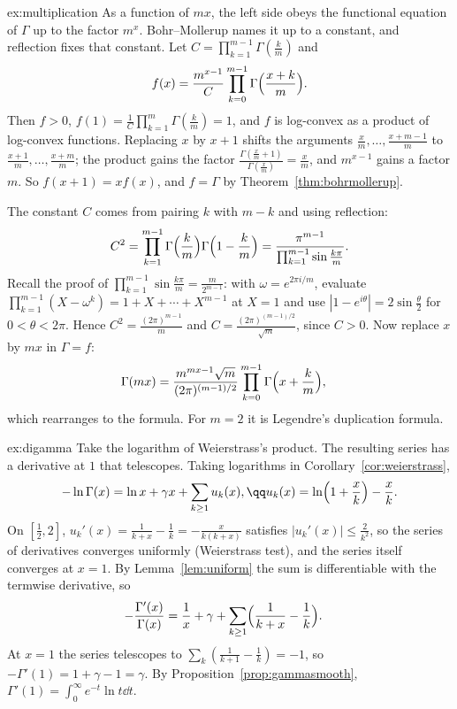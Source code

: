 \begin{solution}{ex:multiplication}
\idea As a function of $mx$, the left side obeys the functional equation of $\Gamma$ up to the factor $m^x$. Bohr--Mollerup names it up to a constant, and reflection fixes that constant.
\writeup Let $C=\prod_{k=1}^{m-1}\Gamma(\frac km)$ and
\[
f(x)=\frac{m^{x-1}}C\prod_{k=0}^{m-1}\Gamma\Bigl(\frac{x+k}m\Bigr).
\]
Then $f>0$, $f(1)=\frac1C\prod_{k=1}^m\Gamma(\frac km)=1$, and
$f$ is log-convex as a product of log-convex functions. Replacing $x$ by $x+1$ shifts the arguments $\frac xm,\dots,\frac{x+m-1}m$ to
$\frac{x+1}m,\dots,\frac{x+m}m$; the product gains the factor $\frac{\Gamma(\frac xm+1)}{\Gamma(\frac xm)}=\frac xm$, and $m^{x-1}$ gains a factor $m$. So
$f(x+1)=xf(x)$, and $f=\Gamma$ by Theorem~\ref{thm:bohrmollerup}.

The constant $C$ comes from pairing $k$ with $m-k$ and using reflection:
\[
C^2=\prod_{k=1}^{m-1}\Gamma\Bigl(\frac km\Bigr)\Gamma\Bigl(1-\frac km\Bigr)=\frac{\pi^{m-1}}{\prod_{k=1}^{m-1}\sin\frac{k\pi}m}.
\]
Recall the proof of $\prod_{k=1}^{m-1}\sin\frac{k\pi}m=\frac m{2^{m-1}}$: with $\omega=e^{2\pi i/m}$, evaluate $\prod_{k=1}^{m-1}(X-\omega^k)=1+X+\cdots+X^{m-1}$ at
$X=1$ and use $|1-e^{i\theta}|=2\sin\frac\theta2$ for $0<\theta<2\pi$. Hence $C^2=\frac{(2\pi)^{m-1}}m$ and $C=\frac{(2\pi)^{(m-1)/2}}{\sqrt m}$, since $C>0$. Now replace $x$
by $mx$ in $\Gamma=f$:
\[
\begin{aligned}\Gamma(mx)&=\frac{m^{mx-1}\sqrt m}{(2\pi)^{(m-1)/2}}\prod_{k=0}^{m-1}\Gamma\Bigl(x+\frac km\Bigr),\end{aligned}
\]
which rearranges to the formula. For $m=2$ it is Legendre's duplication formula.
\end{solution}

\begin{solution}{ex:digamma}
\idea Take the logarithm of Weierstrass's product. The resulting series has a derivative at $1$ that telescopes.
\writeup Taking logarithms in Corollary~\ref{cor:weierstrass},
\[
\begin{gathered}-\ln\Gamma(x)=\ln x+\gamma x+\sum_{k\ge1}u_k(x),\qq u_k(x)=\ln\Bigl(1+\frac xk\Bigr)-\frac xk.\end{gathered}
\]
On $[\frac12,2]$, $u_k'(x)=\frac1{k+x}-\frac1k=-\frac x{k(k+x)}$ satisfies $|u_k'(x)|\le\frac2{k^2}$, so the series of derivatives converges uniformly
(Weierstrass test), and the series itself converges at $x=1$. By Lemma~\ref{lem:uniform} the sum is differentiable with the
termwise derivative, so
\[
\begin{aligned}-\frac{\Gamma'(x)}{\Gamma(x)}&=\frac1x+\gamma+\sum_{k\ge1}\Bigl(\frac1{k+x}-\frac1k\Bigr).\end{aligned}
\]
At $x=1$ the series telescopes to $\sum_k(\frac1{k+1}-\frac1k)=-1$, so $-\Gamma'(1)=1+\gamma-1=\gamma$. By
Proposition~\ref{prop:gammasmooth}, $\Gamma'(1)=\int_0^\infty e^{-t}\ln t\dd t$.
\end{solution}

